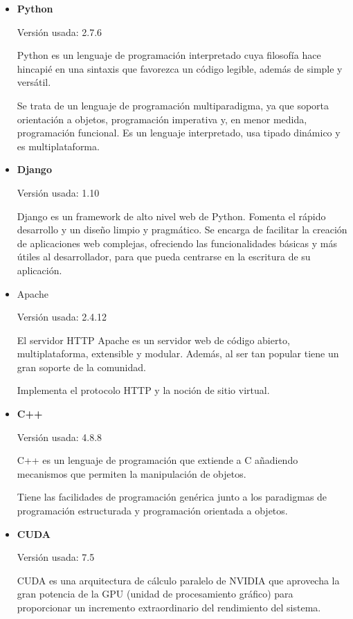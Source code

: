 \begin{itemize}
	\item \textbf{Python}
	
		Versión usada: 2.7.6
		
		Python \cite{python} es un lenguaje de programación interpretado cuya filosofía hace hincapié en una sintaxis que favorezca un código legible, además de simple y versátil.
				
					
		Se trata de un lenguaje de programación multiparadigma, ya que soporta orientación a objetos, programación imperativa y, en menor medida, programación funcional. Es un lenguaje interpretado, usa tipado dinámico y es multiplataforma.
		
	\bigskip	
	\item \textbf{Django}
	
		Versión usada: 1.10
		
		Django \cite{django} es un framework de alto nivel web de Python. Fomenta el rápido desarrollo y un diseño limpio y pragmático. Se encarga de facilitar la creación de aplicaciones web complejas, ofreciendo las funcionalidades básicas y más útiles al desarrollador, para que pueda centrarse en la escritura de su aplicación.
		
	\bigskip				
	\item Apache
	
		Versión usada: 2.4.12
		
		El servidor HTTP Apache \cite{apache} es un servidor web de código abierto, multiplataforma, extensible y modular. Además, al ser tan popular tiene un gran soporte de la comunidad.
		
		Implementa el protocolo HTTP y la noción de sitio virtual. 
		
	\bigskip			
	\item \textbf{C++}
	
	Versión usada: 4.8.8
	
	C++ \cite{cpp} es un lenguaje de programación que extiende a C añadiendo mecanismos que permiten la manipulación de objetos. 
	
	Tiene las facilidades de programación genérica junto a los paradigmas de programación estructurada y programación orientada a objetos. 
		 
	\bigskip
	\item \textbf{CUDA}
	
	Versión usada: 7.5
	
	CUDA \cite{nvidiacuda} es una arquitectura de cálculo paralelo de NVIDIA que aprovecha la gran potencia de la GPU (unidad de procesamiento gráfico) para proporcionar un incremento extraordinario del rendimiento del sistema.
	

\end{itemize}
